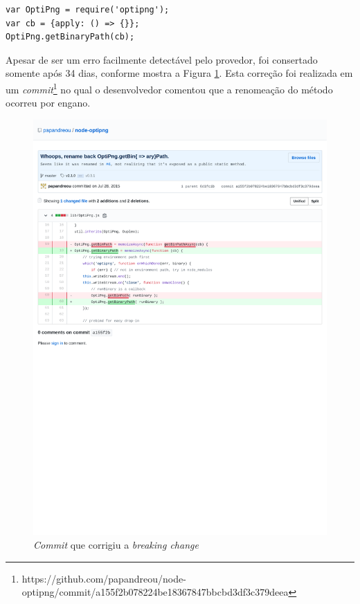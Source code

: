 \begin{lstlisting}[style=Javascript, label=cod:bc:optipng, caption={Código que sofre \textit{breaking change} do pacote \textit{optipng}}]
var OptiPng = require('optipng');
var cb = {apply: () => {}};
OptiPng.getBinaryPath(cb);
\end{lstlisting}

Apesar de ser um erro facilmente detectável pelo provedor, foi consertado somente após 34 dias, conforme mostra a Figura \ref{fig:bc_optipng}. Esta correção foi realizada em um \textit{commit}\footnote{https://github.com/papandreou/node-optipng/commit/a155f2b078224be18367847bbcbd3df3c379deea} no qual o desenvolvedor comentou que a renomeação do método ocorreu por engano.

\begin{figure}
    \centering
    \includegraphics[scale=0.75]{figuras/bc_example.pdf}
    \caption{\textit{Commit} que corrigiu a \textit{breaking change}}
    \label{fig:bc_optipng}
\end{figure}{}

